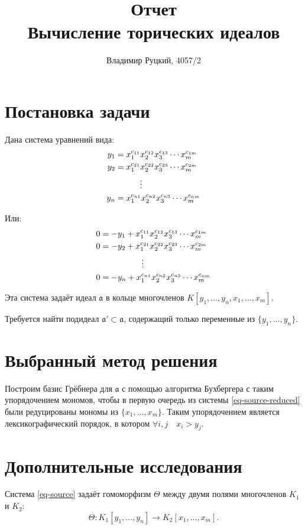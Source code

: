 \documentclass[a4paper,12pt]{article}
\title{Отчет \\ Вычисление торических идеалов}
\author{Владимир Руцкий, 4057/2}
\begin{document}
\maketitle

\section{Постановка задачи}
Дана система уравнений вида:
\begin{align}
  y_1    & = x_1^{c_{11}} x_2^{c_{12}} x_3^{c_{13}} \cdots x_m^{c_{1m}} \notag\\
  y_2    & = x_1^{c_{21}} x_2^{c_{22}} x_3^{c_{23}} \cdots x_m^{c_{2m}} \label{eq-source}\\
         & \quad\quad\quad \vdots \notag\\ %
  y_n    & = x_1^{c_{n1}} x_2^{c_{n2}} x_3^{c_{n3}} \cdots x_m^{c_{nm}} \notag
\end{align}

Или:
\begin{align}
   0 & = -y_1 + x_1^{c_{11}} x_2^{c_{12}} x_3^{c_{13}} \cdots x_m^{c_{1m}} \notag\\
   0 & = -y_2 + x_1^{c_{21}} x_2^{c_{22}} x_3^{c_{23}} \cdots x_m^{c_{2m}} \label{eq-source-reduced}\\
          & \quad\quad\quad\quad\quad \vdots \notag\\ %
   0 & = -y_n + x_1^{c_{n1}} x_2^{c_{n2}} x_3^{c_{n3}} \cdots x_m^{c_{nm}} \notag
\end{align}

Эта система задаёт идеал $\mathfrak{a}$ в кольце многочленов $K[y_1, \ldots, y_n, x_1, \ldots, x_m]$.

Требуется найти подидеал $\mathfrak{a}' \subset \mathfrak{a}$, содержащий только переменные из $\{y_1, \ldots, y_n\}$.

\section{Выбранный метод решения}
Построим базис Грёбнера для $\mathfrak{a}$ с помощью алгоритма Бухбергера с таким упорядочением мономов, 
чтобы в первую очередь из системы \eqref{eq-source-reduced} были редуцированы 
мономы из $\{x_1, \ldots, x_m\}$.
Таким упорядочением является лексикографический порядок, 
в котором $\forall i, j \quad x_i > y_j$.

\section{Дополнительные исследования}
Система \eqref{eq-source} задаёт гомоморфизм $\Theta$ между двумя полями многочленов $K_1$ и $K_2$:
$$\Theta: K_1[y_1, \ldots, y_n] \rightarrow K_2[x_1, \ldots, x_m].$$
\end{document}
